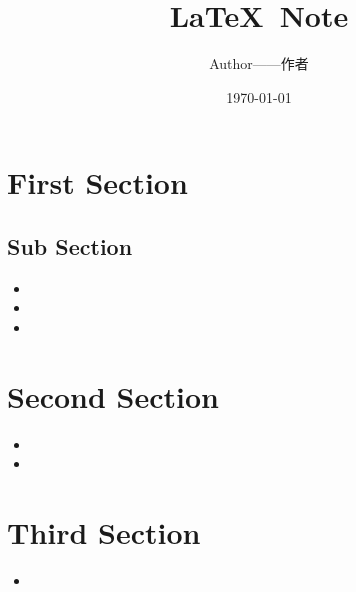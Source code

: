 \documentclass[10.5pt]{article}
\title{\LaTeX~Note}
\author{Author——作者}
\date{\today}
\begin{document}
\maketitle
\lipsum[1-3]


\clearpage

\tableofcontents

\clearpage

\section{First Section}
\label{sec:first}
\zhlipsum[1]

\subsection{Sub Section}
\begin{itemize}
    \item \lipsum[1]
    \item \lipsum[1]
    \item \lipsum[1]
\end{itemize}

\section{Second Section}
\label{sec:second}

\begin{itemize}
    \item \lipsum[1]
    \item \lipsum[1]
\end{itemize}

\section{Third Section}
\label{sec:third}

\begin{itemize}
    \item \lipsum[1]
\end{itemize}


\clearpage
\end{document}
